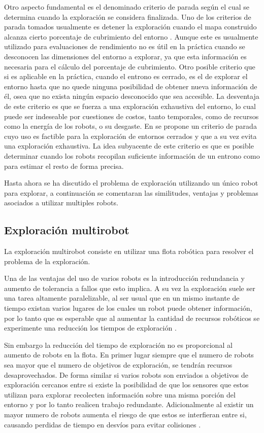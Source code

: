 Otro aspecto fundamental es el denominado criterio de parada según el cual se
determina cuando la exploración se considera finalizada.  Uno de los criterios
de parada tomados usualmente es detener la exploración cuando el mapa
construido alcanza cierto porcentaje de cubrimiento del entorno
\cite{Yan2015}. Aunque este es usualmente utilizado para evaluaciones de
rendimiento no es útil en la práctica cuando se desconocen las dimensiones del
entorno a explorar, ya que esta información es necesaria para el cálculo del
porcentaje de cubrimiento.
Otro posible criterio que si es aplicable en la práctica, cuando el entrono es
cerrado, es el de explorar el entorno hasta que no quede ninguna posibilidad de
obtener nueva información de él, osea que no exista ningún espacio desconocido
que sea accesible. La desventaja de este criterio es que se fuerza a una
exploración exhaustiva del entorno, lo cual puede ser indeseable por cuestiones
de costos, tanto temporales, como de recursos como la energía de los robots, o
su desgaste. En \cite{amorin2019novel} se propone un criterio de parada cuyo
uso es factible para la exploración de entornos cerrados y que a
su vez evita una exploración exhaustiva. La idea subyacente de este criterio es
que es posible determinar cuando los robots recopilan suficiente información de
un entrono como para estimar el resto de forma precisa.

Hasta ahora se ha discutido el problema de exploración utilizando un único
robot para explorar, a continuación se comentaran las similitudes, ventajas y
problemas asociados a utilizar multiples robots.

\subsection{Exploración multirobot}\label{subsec:expmutirob}
La exploración multirobot consiste en utilizar una flota robótica para resolver
el problema de la exploración.

Una de las ventajas del uso de varios robots es la introducción redundancia y
aumento de tolerancia a fallos que esto implica. A su vez la exploración suele
ser una tarea altamente paralelizable, al ser usual que en un mismo instante de
tiempo existan varios lugares de los cuales un robot puede obtener información,
por lo tanto que es esperable que al aumentar la cantidad de recursos robóticos
se experimente una reducción los tiempos de exploración
\cite{cao1997cooperative,dudek1996taxonomy,guzzoni1997many}. 

Sin embargo la reducción del tiempo de exploración no es proporcional al
aumento de robots en la flota. En primer lugar siempre que el numero de robots
sea mayor que el numero de objetivos de exploración, se tendrán recursos
desaprovechados. De forma similar si varios robots son enviados a objetivos de
exploración cercanos entre si existe la posibilidad de que los sensores que
estos utilizan para explorar recolecten información sobre una misma porción del
entorno y por lo tanto realicen trabajo redundante. Adicionalmente al existir
un mayor numero de robots aumenta el riesgo de que estos se interfieran entre
si, causando perdidas de tiempo en desvíos para evitar colisiones
\cite{guzzoni1997many,goldberg1997interference}. 

